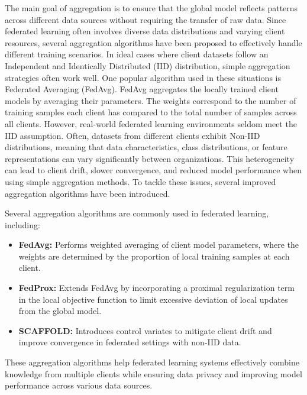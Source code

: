 \documentclass[12pt]{book}
\begin{document}
The main goal of aggregation is to ensure that the global model reflects patterns across different data sources without requiring the transfer of raw data. Since federated learning often involves diverse data distributions and varying client resources, several aggregation algorithms have been proposed to effectively handle different training scenarios. In ideal cases where client datasets follow an Independent and Identically Distributed (IID) distribution, simple aggregation strategies often work well. One popular algorithm used in these situations is Federated Averaging (FedAvg). FedAvg aggregates the locally trained client models by averaging their parameters. The weights correspond to the number of training samples each client has compared to the total number of samples across all clients. However, real-world federated learning environments seldom meet the IID assumption. Often, datasets from different clients exhibit Non-IID distributions, meaning that data characteristics, class distributions, or feature representations can vary significantly between organizations. This heterogeneity can lead to client drift, slower convergence, and reduced model performance when using simple aggregation methods. To tackle these issues, several improved aggregation algorithms have been introduced.

Several aggregation algorithms are commonly used in federated learning, including:

\begin{itemize}
\item \textbf{FedAvg:} Performs weighted averaging of client model parameters, where the weights are determined by the proportion of local training samples at each client.

\item \textbf{FedProx:} Extends FedAvg by incorporating a proximal regularization term in the local objective function to limit excessive deviation of local updates from the global model.

\item \textbf{SCAFFOLD:} Introduces control variates to mitigate client drift and improve convergence in federated settings with non-IID data.

\end{itemize}

These aggregation algorithms help federated learning systems effectively combine knowledge from multiple clients while ensuring data privacy and improving model performance across various data sources.
\end{document}
